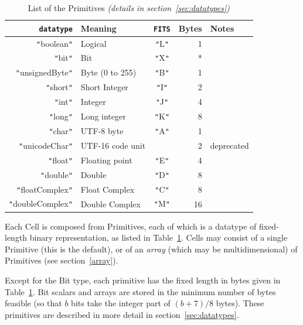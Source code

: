 \documentclass[11pt,a4paper]{ivoa}
\def\Aref#1{section~\ref{#1}}
\def\Tref#1{Table~\ref{#1}}
\let\fg=\color
\def\attr#1{{\tt{\fg{DarkRed}#1}}}
\def\literalvalue#1{{\tt"}{{\fg{DarkPurple}#1}}{\tt"}}
\begin{document}
\begin{table}[hbt]
\begin{center}\begin{tabular}{|r|l|c|r|l|}
\hline
  {\attr{datatype}} & Meaning & \attr{FITS} & { Bytes} & Notes \\
 \hline
 \literalvalue{boolean}      & Logical         &\literalvalue{L}& 1  & \\
 \literalvalue{bit}          & Bit             &\literalvalue{X}& *  & \\
 \literalvalue{unsignedByte} & Byte (0 to 255) &\literalvalue{B}& 1  & \\
 \literalvalue{short}        & Short Integer   &\literalvalue{I}& 2  & \\
 \literalvalue{int}          & Integer         &\literalvalue{J}& 4  & \\
 \literalvalue{long}         & Long integer    &\literalvalue{K}& 8  & \\
 \literalvalue{char}         & UTF-8 byte      &\literalvalue{A}& 1  & \\
 \literalvalue{unicodeChar}  & UTF-16 code unit &        & 2 & deprecated \\
 \literalvalue{float}        & Floating point  &\literalvalue{E}& 4  & \\
 \literalvalue{double}       & Double          &\literalvalue{D}& 8  & \\
 \literalvalue{floatComplex} & Float Complex   &\literalvalue{C}& 8  & \\
 \literalvalue{doubleComplex}& Double Complex  &\literalvalue{M}& 16 & \\
\hline\end{tabular}\end{center}
\caption{\label{primitives}List of the Primitives
{\em(details in \Aref{sec:datatypes})}}\end{table}

Each Cell is composed from Primitives, each of which is a datatype
of fixed-length binary representation, as listed in
\Tref{primitives}.
Cells may consist of a single Primitive (this is
the default), or of an {\em array} (which may be multidimensional)
of Primitives (see \Aref{array}).

Except for the Bit type, each primitive has the fixed length in
bytes given in \Tref{primitives}.
Bit scalars and arrays are stored in
the minimum number of bytes feasible (so that $b$ bits take the integer
part of $(b+7)/8$ bytes).  These primitives
are described in more detail in \Aref{sec:datatypes}.
\end{document}
